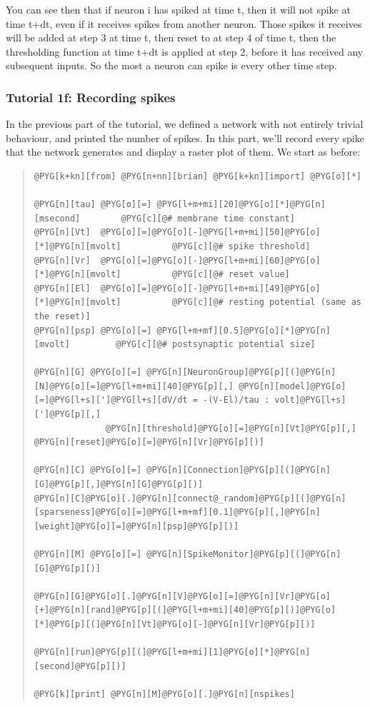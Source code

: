 \documentclass[letterpaper,10pt,english]{manual}
\begin{document}
You can see then that if neuron i has spiked at time t, then it
will not spike at time t+dt, even if it receives spikes from
another neuron. Those spikes it receives will be added at step
3 at time t, then reset to  at step 4 of time t, then the
thresholding function at time t+dt is applied at step 2, before
it has received any subsequent inputs. So the most a neuron
can spike is every other time step.

\resetcurrentobjects
\hypertarget{--doc-tutorial_1f_recording_spikes}{}

\subsubsection{Tutorial 1f: Recording spikes}

In the previous part of the tutorial, we defined a network with
not entirely trivial behaviour, and printed the number of spikes.
In this part, we'll record every spike that the network generates
and display a raster plot of them. We start as before:
\begin{quote}

\begin{Verbatim}[commandchars=@\[\]]
@PYG[k+kn][from] @PYG[n+nn][brian] @PYG[k+kn][import] @PYG[o][*]

@PYG[n][tau] @PYG[o][=] @PYG[l+m+mi][20]@PYG[o][*]@PYG[n][msecond]        @PYG[c][@# membrane time constant]
@PYG[n][Vt]  @PYG[o][=]@PYG[o][-]@PYG[l+m+mi][50]@PYG[o][*]@PYG[n][mvolt]          @PYG[c][@# spike threshold]
@PYG[n][Vr]  @PYG[o][=]@PYG[o][-]@PYG[l+m+mi][60]@PYG[o][*]@PYG[n][mvolt]          @PYG[c][@# reset value]
@PYG[n][El]  @PYG[o][=]@PYG[o][-]@PYG[l+m+mi][49]@PYG[o][*]@PYG[n][mvolt]          @PYG[c][@# resting potential (same as the reset)]
@PYG[n][psp] @PYG[o][=] @PYG[l+m+mf][0.5]@PYG[o][*]@PYG[n][mvolt]         @PYG[c][@# postsynaptic potential size]

@PYG[n][G] @PYG[o][=] @PYG[n][NeuronGroup]@PYG[p][(]@PYG[n][N]@PYG[o][=]@PYG[l+m+mi][40]@PYG[p][,] @PYG[n][model]@PYG[o][=]@PYG[l+s][']@PYG[l+s][dV/dt = -(V-El)/tau : volt]@PYG[l+s][']@PYG[p][,]
              @PYG[n][threshold]@PYG[o][=]@PYG[n][Vt]@PYG[p][,] @PYG[n][reset]@PYG[o][=]@PYG[n][Vr]@PYG[p][)]

@PYG[n][C] @PYG[o][=] @PYG[n][Connection]@PYG[p][(]@PYG[n][G]@PYG[p][,]@PYG[n][G]@PYG[p][)]
@PYG[n][C]@PYG[o][.]@PYG[n][connect@_random]@PYG[p][(]@PYG[n][sparseness]@PYG[o][=]@PYG[l+m+mf][0.1]@PYG[p][,]@PYG[n][weight]@PYG[o][=]@PYG[n][psp]@PYG[p][)]

@PYG[n][M] @PYG[o][=] @PYG[n][SpikeMonitor]@PYG[p][(]@PYG[n][G]@PYG[p][)]

@PYG[n][G]@PYG[o][.]@PYG[n][V]@PYG[o][=]@PYG[n][Vr]@PYG[o][+]@PYG[n][rand]@PYG[p][(]@PYG[l+m+mi][40]@PYG[p][)]@PYG[o][*]@PYG[p][(]@PYG[n][Vt]@PYG[o][-]@PYG[n][Vr]@PYG[p][)]

@PYG[n][run]@PYG[p][(]@PYG[l+m+mi][1]@PYG[o][*]@PYG[n][second]@PYG[p][)]

@PYG[k][print] @PYG[n][M]@PYG[o][.]@PYG[n][nspikes]
\end{Verbatim}
\end{quote}
\end{document}

